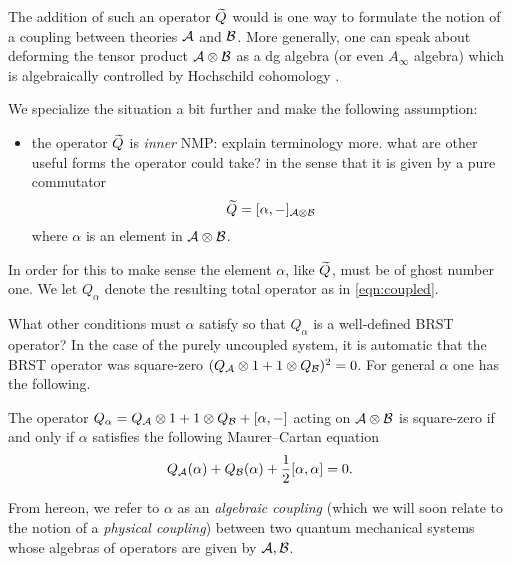 \documentclass[11pt]{amsart}
\def\natalie#1{{\textcolor{green!65!black}{NMP: {#1}}}}
\begin{document}
The addition of such an operator $\widetilde{Q}$ would is one way to formulate the notion of a coupling between theories $\mathcal A$ and $\mathcal B$. 
More generally, one can speak about deforming the tensor product $\mathcal A \otimes \mathcal B$ as a dg algebra (or even $A_\infty$ algebra) which is algebraically controlled by Hochschild cohomology \cite{refs?}. 

We specialize the situation a bit further and make the following assumption: 
\begin{itemize}
\item the operator $\widetilde{Q}$ is {\em inner} \natalie{explain terminology more. what are other useful forms the operator could take?} in the sense that it is given by a pure commutator
\[
\widetilde{Q} = [\alpha, -]_{\mathcal A \otimes \mathcal B}
\]
where $\alpha$ is an element in $\mathcal A \otimes \mathcal B$. 
\end{itemize}
In order for this to make sense the element $\alpha$, like $\widetilde{Q}$, must be of ghost number one. 
We let $Q_\alpha$ denote the resulting total operator as in \eqref{eqn:coupled}. 

What other conditions must $\alpha$ satisfy so that $Q_\alpha$ is a well-defined BRST operator? 
In the case of the purely uncoupled system, it is automatic that the BRST operator was square-zero $(Q_{\mathcal A} \otimes 1 + 1 \otimes Q_{\mathcal B})^2 = 0$. 
For general $\alpha$ one has the following. 

\begin{lem}
The operator $Q_\alpha = Q_{\mathcal A} \otimes 1 + 1 \otimes Q_{\mathcal B} + [\alpha,-]$ acting on $\mathcal A \otimes \mathcal B$ is square-zero if and only if $\alpha$ satisfies the following Maurer--Cartan equation 
\[
Q_{\mathcal A} (\alpha) + Q_{\mathcal B}(\alpha) + \frac12 [\alpha, \alpha] = 0 .
\]
\end{lem}

From hereon, we refer to $\alpha$ as an {\em algebraic coupling} (which we will soon relate to the notion of a {\em physical coupling}) between two quantum mechanical systems whose algebras of operators are given by ${\mathcal A}, {\mathcal B}$. 
\end{document}
